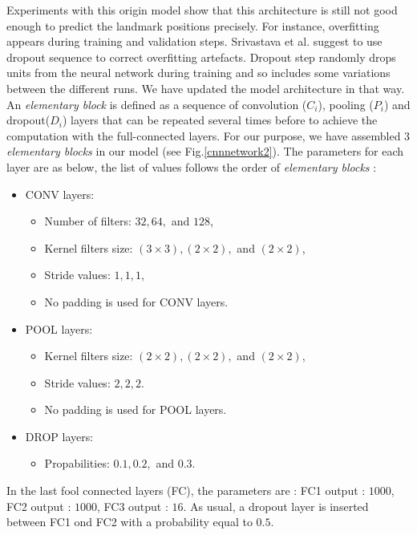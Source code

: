 \documentclass[10pt]{article}
\begin{document}
Experiments with this origin model show that this architecture is still
not good enough to predict the landmark positions precisely. For
instance, overfitting appears during training and validation
steps. Srivastava et al. \cite{srivastava2014dropout} suggest to use
dropout sequence to correct overfitting artefacts. Dropout step randomly drops units from the
neural network during training and so includes some variations between
the different runs. We have updated the model architecture in that
way. An \textit{elementary block} is defined as a sequence of
convolution (\textit{$C_i$}), pooling (\textit{$P_i$}) and dropout(\textit{$D_i$}) layers that can be repeated several
times before to achieve the computation with the full-connected
layers. For our purpose, we have assembled $3$ \textit{elementary
  blocks} in our model (see Fig.\ref{cnnnetwork2}). The parameters for
each layer are as below, the list of values follows the order of
\textit{elementary blocks} :

\begin{itemize}[nosep,label=\footnotesize$\bullet$]

\item CONV layers:
		\begin{itemize}[nosep]
			\item Number of filters: $32, 64,$ and $128$,
			\item Kernel filters size: $(3 \times 3), (2 \times 2),$ and $(2 \times 2)$,
			\item Stride values: $1, 1, 1$,
			\item No padding is used for CONV layers.
		\end{itemize}			
	\item POOL layers:
		\begin{itemize}[nosep]
			\item Kernel filters size: $(2 \times 2), (2 \times 2),$ and $(2 \times 2)$,
			\item Stride values: $2, 2, 2$.
			\item No padding is used for POOL layers.
		\end{itemize}
	\item DROP layers: 
		\begin{itemize}[nosep]
			\item Propabilities: $0.1, 0.2, $ and $0.3$.
		\end{itemize}
	\end{itemize}
In the last fool connected layers (FC), the parameters are : FC1 output :
$1000$, FC2 output : $1000$, FC3  output : $16$. As usual, a dropout layer is
inserted between FC1 ond FC2 with a probability equal to $0.5$.
\end{document}
